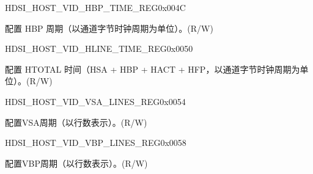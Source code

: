    
    \begin{register}{H}{DSI\_HOST\_VID\_HBP\_TIME\_REG}{0x004C}\label{regdesc:DSIHOSTVIDHBPTIMEREG}
    \regnewline%
    \begin{regdesc}\begin{reglist}
    \label{fielddesc:DSIHOSTVIDHBPTIME}\item [DSI\_HOST\_VID\_HBP\_TIME] 配置 HBP 周期（以通道字节时钟周期为单位）。(R/W)
    \end{reglist}\end{regdesc}
    \end{register}
    
    
    \begin{register}{H}{DSI\_HOST\_VID\_HLINE\_TIME\_REG}{0x0050}\label{regdesc:DSIHOSTVIDHLINETIMEREG}
    \regnewline%
    \begin{regdesc}\begin{reglist}
    \label{fielddesc:DSIHOSTVIDHLINETIME}\item [DSI\_HOST\_VID\_HLINE\_TIME] 配置 HTOTAL 时间（HSA + HBP + HACT + HFP，以通道字节时钟周期为单位）。(R/W)
    \end{reglist}\end{regdesc}
    \end{register}
    
    
    \begin{register}{H}{DSI\_HOST\_VID\_VSA\_LINES\_REG}{0x0054}\label{regdesc:DSIHOSTVIDVSALINESREG}
    \regnewline%
    \begin{regdesc}\begin{reglist}
    \label{fielddesc:DSIHOSTVSALINES}\item [DSI\_HOST\_VSA\_LINES] 配置VSA周期（以行数表示）。(R/W)
    \end{reglist}\end{regdesc}
    \end{register}
    
    
    \begin{register}{H}{DSI\_HOST\_VID\_VBP\_LINES\_REG}{0x0058}\label{regdesc:DSIHOSTVIDVBPLINESREG}
    \regnewline%
    \begin{regdesc}\begin{reglist}
    \label{fielddesc:DSIHOSTVBPLINES}\item [DSI\_HOST\_VBP\_LINES] 配置VBP周期（以行数表示）。(R/W)
    \end{reglist}\end{regdesc}
    \end{register}
    
